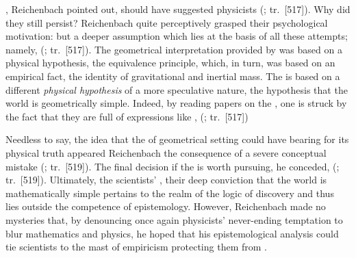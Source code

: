 \documentclass[draft]{article}
\renewcommand{\rzlap}[2]{(\cite[#1]{Reichenbach1928}; tr.\ [#2])\xspace}
\begin{document}
, Reichenbach pointed out, should have suggested physicists  \rzlap{370}{517}. Why did they still persist? Reichenbach quite perceptively grasped their psychological motivation:  but a deeper assumption which lies at the basis of all these attempts; namely,  \rzlap{370}{517}. The geometrical interpretation provided by \gr was based on a physical hypothesis, the equivalence principle, which, in turn, was based on an empirical fact, the identity of gravitational and inertial mass. The \uftp is based on a different \emph{physical hypothesis} of a more speculative nature, the hypothesis that the world is geometrically simple. Indeed, by reading papers on the \uft, one is struck by the fact that they are full of expressions like , \etc \rzlap{370}{517}

Needless to say, the idea that the  of geometrical setting could have bearing for its physical truth appeared Reichenbach the consequence of a severe conceptual mistake \rzlap{372}{519}. The final decision if the \uftp is worth pursuing, he conceded,  \rzlap{372}{519}. Ultimately, the scientists' , their deep conviction that the world is mathematically simple pertains to the realm of the logic of discovery and thus lies outside the competence of epistemology. However, Reichenbach made no mysteries that, by denouncing once again physicists' never-ending temptation to blur mathematics and physics, he hoped that his epistemological analysis could tie scientists to the mast of empiricism protecting them from  \citep[373]{Reichenbach1928}. 
\end{document}

